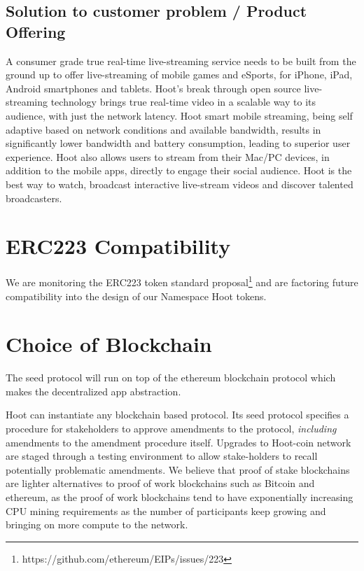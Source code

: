 \documentclass{article}
\begin{document}
\subsection{Solution to customer problem / Product Offering}
A consumer grade true real-time live-streaming service needs to be
built from the ground up to offer live-streaming of mobile games and eSports, for iPhone, iPad, Android smartphones and tablets. Hoot's break through open source live-streaming technology brings true real-time video in a scalable way to its audience, with just the network latency. Hoot smart mobile streaming, being self adaptive based on network conditions and available bandwidth, results in significantly lower bandwidth and battery consumption, leading to superior user experience. Hoot also allows users to stream from their Mac/PC devices, in addition to the mobile apps, directly to engage their social audience. Hoot is the best way to watch, broadcast interactive live-stream videos and discover talented broadcasters.

%


\section{ERC223 Compatibility}
We are monitoring the ERC223 token standard proposal\footnote{https://github.com/ethereum/EIPs/issues/223} and are factoring future compatibility into the design of our Namespace Hoot tokens.

\section{Choice of Blockchain}
The seed protocol will run on top of the ethereum blockchain protocol which makes the decentralized app abstraction. 



Hoot can instantiate any blockchain based protocol. Its seed protocol specifies a procedure for stakeholders to approve amendments to the protocol, \emph{including} amendments to the amendment procedure itself. Upgrades to Hoot-coin network are staged through a testing environment to allow stake-holders to recall potentially problematic amendments. We believe that proof of stake blockchains are lighter alternatives to proof of work blockchains such as Bitcoin and ethereum, as the proof of work blockchains tend to have exponentially increasing CPU mining requirements as the number of participants keep growing and bringing on more compute to the network.
\end{document}
